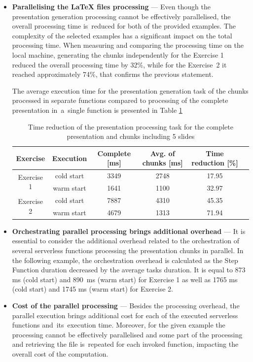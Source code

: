 \begin{itemize}
    \item \textbf{Parallelising the LaTeX files processing} --- Even though the presentation generation processing cannot be effectively parallelised, the overall processing time is~reduced for both of the provided examples.
    The complexity of the selected examples has a significant impact on the total processing time.
    When measuring and comparing the processing time on the local machine, generating the chunks independently for the Exercise 1 reduced the overall processing time by 32\%, while for the Exercise~2 it reached approximately 74\%, that confirms the previous statement.
  
    The average execution time for the presentation generation task of the chunks processed in separate functions compared to processing of the complete presentation in~a~single function is presented in Table \ref{table:overhead-of-the-presentation-processing-task-for-the-whole-presentation-and-chunks-including-5-slides}

    \begin{table}[h]
        \centering
        \begin{tabular}{ |c|c|c|c|c|c| } 
        \hline
        Exercise & Execution & Complete [ms] & Avg. of chunks [ms] & Time reduction [\%] \\
        \hline
        \multirow{2}{*}{Exercise 1} & cold start & 3349 & 2748 & 17.95 \\
        & warm start & 1641 & 1100 & 32.97 \\
        \hline
        \multirow{2}{*}{Exercise 2} & cold start & 7887 & 4310 & 45.35 \\
        & warm start & 4679 & 1313 & 71.94 \\
        \hline
        \end{tabular}
        \caption{Time reduction of the presentation processing task for the complete presentation and chunks including 5 slides}
        \label{table:overhead-of-the-presentation-processing-task-for-the-whole-presentation-and-chunks-including-5-slides}
    \end{table}

   \item \textbf{Orchestrating parallel processing brings additional overhead} --- It is essential to consider the additional overhead related to the orchestration of several serverless functions processing the presentation chunks in parallel. In the following example, the orchestration overhead is calculated as the Step Function duration decreased by the average tasks duration. It is equal to 873 ms (cold start) and 890~ms (warm start) for Exercise 1 as well as 1765 ms (cold start) and 1745 ms (warm start) for Exercise 2.
   \item \textbf{Cost of the parallel processing} --- Besides the processing overhead, the parallel execution brings additional cost for each of the executed serverless functions and~its~execution time. Moreover, for the given example the processing cannot be effectively parallelised and some part of the processing and retrieving the file is~repeated for each invoked function, impacting the overall cost of the computation.
\end{itemize}

